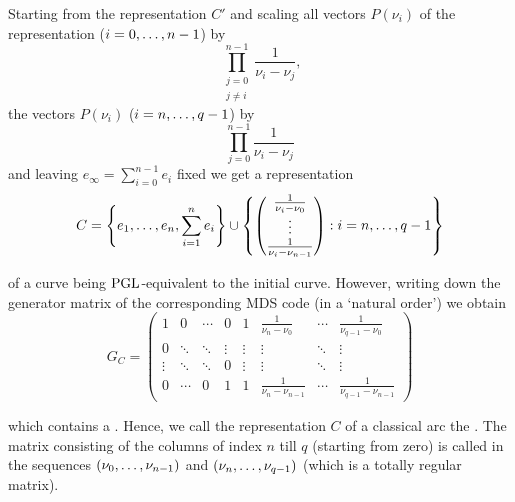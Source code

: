 Starting from the representation $C'$ and scaling all vectors $P(\nu_i)$ of the representation ($i=\range 0 {n-1}$) by
$$ \prod_{\substack{j=0\\ j\neq i}}^{n-1}{\frac{1}{\nu_i-\nu_j}}\textrm{,} $$
the vectors $P(\nu_i)$ ($i=\range n {q-1}$) by 
$$ \prod_{j=0}^{n-1}{\frac{1}{\nu_i-\nu_j}} $$
and leaving $e_{\infty}=\sum_{i=0}^{n-1}{e_i}$ fixed we get a representation
$$
C = \set{e_1,\ldots,e_n,\sum_{i=1}^n{e_i}}\setjoin\set{\begin{pmatrix} \frac{1}{\nu_i-\nu_0} \\ \vdots\\ \frac{1}{\nu_i-\nu_{n-1}}\end{pmatrix}}[i=\range n {q-1}]
$$

of a curve being $\mathrm{PGL}$-equivalent to the initial curve.
However, writing down the generator matrix of the corresponding MDS code (in a `natural order') we obtain
$$ G_C =
    \begin{pmatrix}
        1      & 0      & \cdots & 0      & 1      & \frac{1}{\nu_n-\nu_0} & \cdots & \frac{1}{\nu_{q-1}-\nu_0} \\
        0      & \ddots & \ddots & \vdots & \vdots & \vdots                & \ddots & \vdots            \\
        \vdots & \ddots & \ddots & 0      & \vdots & \vdots                & \ddots & \vdots            \\
        0      & \cdots & 0      & 1      & 1      & \frac{1}{\nu_n-\nu_{n-1}} & \cdots & \frac{1}{\nu_{q-1}-\nu_{n-1}}
    \end{pmatrix} $$

which contains a . Hence, we call the representation $C$ of a classical arc the . The matrix consisting of the columns of index $n$ till $q$ (starting from zero) is called  in the sequences $\seq{\range{\nu_0}{\nu_{n-1}}}$ and $\seq{\range{\nu_n}{\nu_{q-1}}}$ (which is a totally regular matrix).\label{cauchy-rep}

